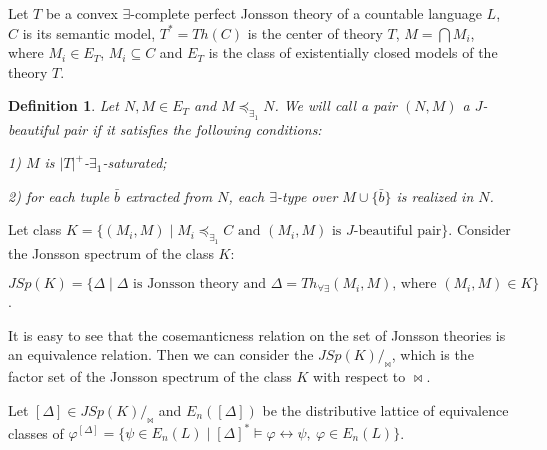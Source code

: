 \documentclass[bsl,meeting]{asl}
\newtheorem{definition}{Definition}
\newcommand{\NP}{}
\begin{document}
\thispagestyle{empty}


\NP
{}


Let $T$ be a convex $\exists$-complete perfect Jonsson theory of a countable language $L$, $C$ is its semantic model, $T^*=Th(C)$ is the center of theory $T$, $M=\bigcap M_i$, where $M_i\in E_T$, $M_i\subseteq C$ and $E_T$ is the class of existentially closed models of the theory $T$.

\begin{definition}
Let $N,M\in E_T$ and $M\preceq_{\exists_1} N$. We will call a pair $(N,M)$ a $J$-beautiful pair if it satisfies the following conditions:

1) $M$ is $|T|^+$-$\exists_1$-saturated;

2) for each tuple $\bar{b}$ extracted from $N$, each $\exists$-type over $M\cup\{\bar{b}\}$ is realized in $N$.
\end{definition}

Let class $K=\{(M_i,M)\mid M_i\preceq_{\exists_1}C \text{ and } (M_i,M) \text{ is $J$-beautiful pair}\}$. 
Consider the Jonsson spectrum of the class $K$:
\begin{center}
$JSp(K)=\{\Delta\mid\Delta \text{ is Jonsson theory and } \Delta=Th_{\forall\exists}(M_i,M) \text{, where } (M_i,M)\in K\}$.
\end{center}
It is easy to see that the cosemanticness relation on the set of Jonsson theories is an equivalence relation. Then we can consider the $JSp(K)/_{\bowtie}$, which is the factor set of the Jonsson spectrum of the class $K$ with respect to $\bowtie$.

Let $[\Delta]\in JSp(K)/_{\bowtie}$ and $E_n([\Delta])$ be the distributive lattice of equivalence classes of $\varphi^{[\Delta]}=\{\psi\in E_n(L)\mid [\Delta]^*\models \varphi\leftrightarrow\psi,\ \varphi\in E_n(L)\}$.
\end{document}
